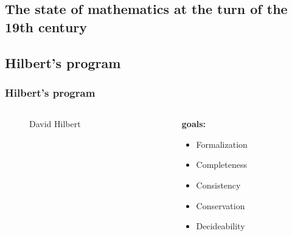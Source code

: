 \renewcommand{\implies}{\Rightarrow}
\subsection{The state of mathematics at the turn of the 19th century}

\subsection{Hilbert's program}

\begin{frame}
  \frametitle{Hilbert's program}
  \begin{columns}
    \begin{column}{.3\textwidth}
      \begin{figure}[ht]  
        \caption*{David Hilbert}
      \end{figure}
    \end{column}
    \begin{column}{.8\textwidth}
      \textbf{goals:}
      \begin{itemize}
          \item Formalization
          \pause \item Completeness
          \pause \item Consistency
          \pause \item Conservation
          \pause \item Decideability
        \end{itemize}
        \onslide{}
    \end{column}
  \end{columns}
\end{frame}

